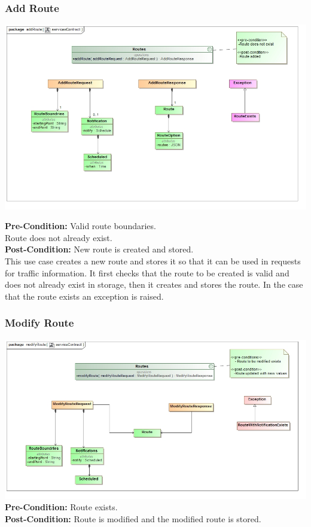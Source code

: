 \documentclass[a4paper,12pt]{article}
\begin{document}
\subsubsection{Add Route}
\includegraphics[width=\textwidth]{images/scAdd_Route.jpg}


\textbf{Pre-Condition: }
Valid route boundaries.\\
Route does not already exist.\\
\textbf{Post-Condition: }
New route is created and stored.\\

This use case creates a new route and stores it so that it can be used in requests for traffic information. It first checks that the route to be created is valid and does not already exist in storage, then it creates and stores the route. In the case that the route exists an exception is raised.
\subsubsection{Modify Route} 
\includegraphics[width=\textwidth]{images/scModify_Route.jpg}
\textbf{Pre-Condition: }
Route exists.\\
\textbf{Post-Condition: }
Route is modified and the modified route is stored.\\
\end{document}
